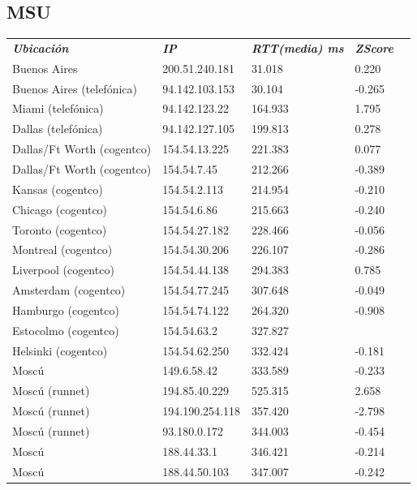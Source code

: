 \newpage

\subsection{MSU}

\begin{center}
\begin{tabular}{lllll}

	\textit{\textbf{Ubicaci\'on}}	&	\textit{\textbf{IP}}	&	\textit{\textbf{RTT(media) ms}}	&	\textit{\textbf{ZScore}}	\\
	Buenos Aires			&	200.51.240.181	&	31.018	&	0.220	\\
	Buenos Aires (telef\'onica)	&	94.142.103.153	&	30.104	&	-0.265	\\
	\intercontinental
	Miami (telef\'onica)		&	94.142.123.22	&	164.933	&	1.795	\\
	Dallas (telef\'onica)		&	94.142.127.105	&	199.813	&	0.278	\\
	Dallas/Ft Worth (cogentco)	&	154.54.13.225	&	221.383	&	0.077	\\
	Dallas/Ft Worth (cogentco)	&	154.54.7.45	&	212.266	&	-0.389	\\
	Kansas (cogentco)		&	154.54.2.113	&	214.954	&	-0.210	\\
	Chicago (cogentco)		&	154.54.6.86	&	215.663	&	-0.240	\\
	Toronto (cogentco)		&	154.54.27.182	&	228.466	&	-0.056	\\
	Montreal (cogentco)		&	154.54.30.206	&	226.107	&	-0.286	\\
	\intercontinental
	Liverpool (cogentco)		&	154.54.44.138	&	294.383	&	0.785	\\
	Amsterdam (cogentco)		&	154.54.77.245	&	307.648	&	-0.049	\\
	Hamburgo (cogentco)		&	154.54.74.122	&	264.320	&	-0.908	\\
	Estocolmo (cogentco)		&	154.54.63.2	&	327.827	&	\highestcontinental 0.713	\\
	Helsinki (cogentco)		&	154.54.62.250	&	332.424	&	-0.181	\\
	Mosc\'u				&	149.6.58.42	&	333.589	&	-0.233	\\
	Mosc\'u (runnet)		&	194.85.40.229	&	525.315	&	2.658	\\
	Mosc\'u (runnet)		&	194.190.254.118	&	357.420	&	-2.798	\\
	Mosc\'u (runnet)		&	93.180.0.172	&	344.003	&	-0.454	\\
	Mosc\'u				&	188.44.33.1	&	346.421	&	-0.214	\\
	Mosc\'u				&	188.44.50.103	&	347.007	&	-0.242	\\

\end{tabular}
\end{center}

